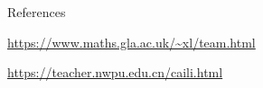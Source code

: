 
\begin{rubric}{References}

\entry*[Supervisors] 
\url{https://www.maths.gla.ac.uk/~xl/team.html}\par
\url{https://teacher.nwpu.edu.cn/caili.html}\par










\end{rubric}